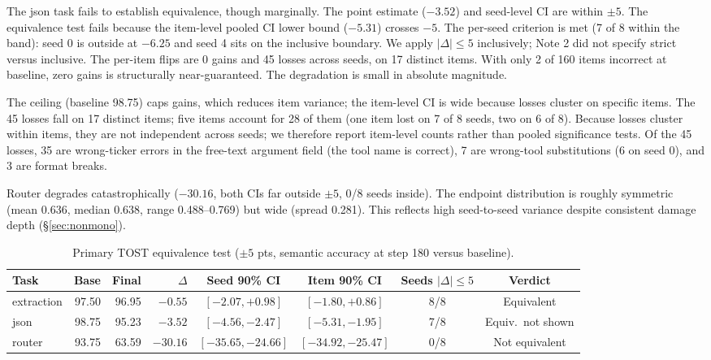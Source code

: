 \documentclass{article}
\begin{document}
The json task fails to establish equivalence, though marginally. The point estimate ($-3.52$) and seed-level CI are within $\pm5$. The equivalence test fails because the item-level pooled CI lower bound ($-5.31$) crosses $-5$. The per-seed criterion is met (7 of 8 within the band): seed 0 is outside at $-6.25$ and seed 4 sits on the inclusive boundary. We apply $|\Delta| \le 5$ inclusively; Note 2 did not specify strict versus inclusive. The per-item flips are 0 gains and 45 losses across seeds, on 17 distinct items. With only 2 of 160 items incorrect at baseline, zero gains is structurally near-guaranteed. The degradation is small in absolute magnitude.

The ceiling (baseline 98.75) caps gains, which reduces item variance; the item-level CI is wide because losses cluster on specific items. The 45 losses fall on 17 distinct items; five items account for 28 of them (one item lost on 7 of 8 seeds, two on 6 of 8). Because losses cluster within items, they are not independent across seeds; we therefore report item-level counts rather than pooled significance tests. Of the 45 losses, 35 are wrong-ticker errors in the free-text argument field (the tool name is correct), 7 are wrong-tool substitutions (6 on seed 0), and 3 are format breaks.

Router degrades catastrophically ($-30.16$, both CIs far outside $\pm5$, 0/8 seeds inside). The endpoint distribution is roughly symmetric (mean 0.636, median 0.638, range 0.488--0.769) but wide (spread 0.281). This reflects high seed-to-seed variance despite consistent damage depth (\S\ref{sec:nonmono}).

\begin{table}[H]
\centering
\caption{Primary TOST equivalence test ($\pm5$ pts, semantic accuracy at step 180 versus baseline).}
\label{tab:tost}
\small
\setlength{\tabcolsep}{3pt}
\begin{tabular}{@{}lrrrcccc@{}}
\toprule
Task & Base & Final & $\Delta$ & Seed 90\% CI & Item 90\% CI & Seeds $|\Delta|\le5$ & Verdict\\
\midrule
extraction & 97.50 & 96.95 & $-0.55$ & $[-2.07, +0.98]$ & $[-1.80, +0.86]$ & 8/8 & Equivalent\\
json & 98.75 & 95.23 & $-3.52$ & $[-4.56, -2.47]$ & $[-5.31, -1.95]$ & 7/8 & Equiv.\ not shown\\
router & 93.75 & 63.59 & $-30.16$ & $[-35.65, -24.66]$ & $[-34.92, -25.47]$ & 0/8 & Not equivalent\\
\bottomrule
\end{tabular}
\end{table}
\end{document}
